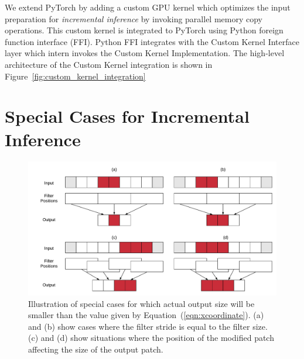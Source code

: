 We extend PyTorch by adding a custom GPU kernel which optimizes the input preparation for \textit{incremental inference} by invoking parallel memory copy operations.
This custom kernel is integrated to PyTorch using Python foreign function interface (FFI).
Python FFI integrates with the Custom Kernel Interface layer which intern invokes the Custom Kernel Implementation.
The high-level architecture of the Custom Kernel integration is shown in Figure~\ref{fig:custom_kernel_integration}


\section{Special Cases for Incremental Inference}

\begin{figure}[t]
\includegraphics[width=\columnwidth]{images/less_one_example}
\vspace{-6mm}
\caption{Illustration of special cases for which actual output size will be smaller than the value given by Equation~(\ref{eqn:xcoordinate}). (a) and (b) show cases where the filter stride is equal to the filter size. (c) and (d) show situations where the position of the modified patch affecting the size of the output patch.}
\vspace{-4mm}
\label{fig:less_one_example}
\end{figure}


